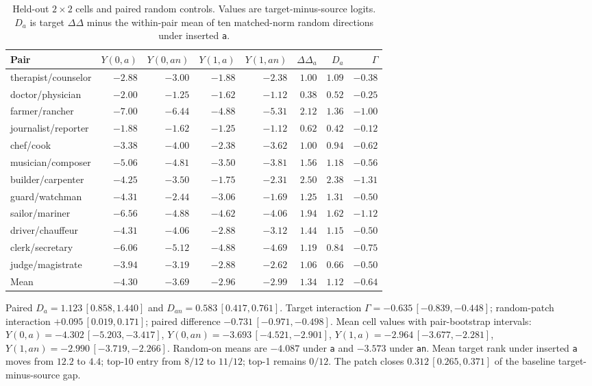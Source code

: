 \begin{table}[h]
\centering
\caption{Held-out \(2\times 2\) cells and paired random controls. Values
are target-minus-source logits. \(D_a\) is target \(\Delta\Delta\) minus
the within-pair mean of ten matched-norm random directions under inserted
\texttt{a}.}
\label{tbl-prearticle-pairs}
\scriptsize
\setlength{\tabcolsep}{3pt}
\begin{tabular}{lrrrrrrr}
\toprule
Pair & \(Y(0,a)\) & \(Y(0,an)\) & \(Y(1,a)\) & \(Y(1,an)\) & \(\Delta\Delta_a\) & \(D_a\) & \(\Gamma\) \\
\midrule
therapist/counselor & \(-2.88\) & \(-3.00\) & \(-1.88\) & \(-2.38\) & \(1.00\) & \(1.09\) & \(-0.38\) \\
doctor/physician & \(-2.00\) & \(-1.25\) & \(-1.62\) & \(-1.12\) & \(0.38\) & \(0.52\) & \(-0.25\) \\
farmer/rancher & \(-7.00\) & \(-6.44\) & \(-4.88\) & \(-5.31\) & \(2.12\) & \(1.36\) & \(-1.00\) \\
journalist/reporter & \(-1.88\) & \(-1.62\) & \(-1.25\) & \(-1.12\) & \(0.62\) & \(0.42\) & \(-0.12\) \\
chef/cook & \(-3.38\) & \(-4.00\) & \(-2.38\) & \(-3.62\) & \(1.00\) & \(0.94\) & \(-0.62\) \\
musician/composer & \(-5.06\) & \(-4.81\) & \(-3.50\) & \(-3.81\) & \(1.56\) & \(1.18\) & \(-0.56\) \\
builder/carpenter & \(-4.25\) & \(-3.50\) & \(-1.75\) & \(-2.31\) & \(2.50\) & \(2.38\) & \(-1.31\) \\
guard/watchman & \(-4.31\) & \(-2.44\) & \(-3.06\) & \(-1.69\) & \(1.25\) & \(1.31\) & \(-0.50\) \\
sailor/mariner & \(-6.56\) & \(-4.88\) & \(-4.62\) & \(-4.06\) & \(1.94\) & \(1.62\) & \(-1.12\) \\
driver/chauffeur & \(-4.31\) & \(-4.06\) & \(-2.88\) & \(-3.12\) & \(1.44\) & \(1.15\) & \(-0.50\) \\
clerk/secretary & \(-6.06\) & \(-5.12\) & \(-4.88\) & \(-4.69\) & \(1.19\) & \(0.84\) & \(-0.75\) \\
judge/magistrate & \(-3.94\) & \(-3.19\) & \(-2.88\) & \(-2.62\) & \(1.06\) & \(0.66\) & \(-0.50\) \\
\midrule
Mean & \(-4.30\) & \(-3.69\) & \(-2.96\) & \(-2.99\) & \(1.34\) & \(1.12\) & \(-0.64\) \\
\bottomrule
\end{tabular}
\end{table}

Paired \(D_a=1.123\,[0.858,1.440]\) and \(D_{an}=0.583\,[0.417,0.761]\).
Target interaction \(\Gamma=-0.635\,[-0.839,-0.448]\); random-patch
interaction \(+0.095\,[0.019,0.171]\); paired difference
\(-0.731\,[-0.971,-0.498]\). Mean cell values with pair-bootstrap
intervals: \(Y(0,a)=-4.302\,[-5.203,-3.417]\),
\(Y(0,an)=-3.693\,[-4.521,-2.901]\),
\(Y(1,a)=-2.964\,[-3.677,-2.281]\),
\(Y(1,an)=-2.990\,[-3.719,-2.266]\). Random-on means are
\(-4.087\) under \texttt{a} and \(-3.573\) under \texttt{an}. Mean
target rank under inserted \texttt{a} moves from \(12.2\) to \(4.4\);
top-10 entry from \(8/12\) to \(11/12\); top-1 remains \(0/12\). The
patch closes \(0.312\,[0.265,0.371]\) of the baseline
target-minus-source gap.
